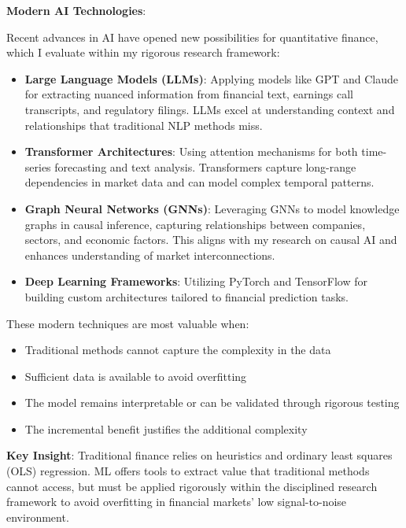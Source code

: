 \documentclass[11pt, letterpaper]{article}
\begin{document}
  \textbf{Modern AI Technologies}:

  Recent advances in AI have opened new possibilities for quantitative finance,
  which I evaluate within my rigorous research framework:

  \begin{itemize}
    \item \textbf{Large Language Models (LLMs)}: Applying models like GPT
      and Claude for extracting nuanced information from financial text,
      earnings call transcripts, and regulatory filings. LLMs excel at
      understanding context and relationships that traditional NLP
      methods miss.

    \item \textbf{Transformer Architectures}: Using attention mechanisms
      for both time-series forecasting and text analysis. Transformers
      capture long-range dependencies in market data and can model
      complex temporal patterns.

    \item \textbf{Graph Neural Networks (GNNs)}: Leveraging GNNs to model
      knowledge graphs in causal inference, capturing relationships
      between companies, sectors, and economic factors. This aligns with
      my research on causal AI and enhances understanding of market interconnections.

    \item \textbf{Deep Learning Frameworks}: Utilizing PyTorch and TensorFlow
      for building custom architectures tailored to financial prediction
      tasks.
  \end{itemize}

  These modern techniques are most valuable when:

  \begin{itemize}
    \item Traditional methods cannot capture the complexity in the data

    \item Sufficient data is available to avoid overfitting

    \item The model remains interpretable or can be validated through rigorous
      testing

    \item The incremental benefit justifies the additional complexity
  \end{itemize}

  \textbf{Key Insight}: Traditional finance relies on heuristics and
  ordinary least squares (OLS) regression. ML offers tools to extract value
  that traditional methods cannot access, but must be applied rigorously
  within the disciplined research framework to avoid overfitting in
  financial markets' low signal-to-noise environment.
\end{document}
